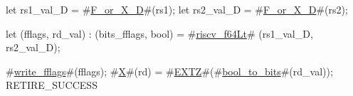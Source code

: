 let rs1_val_D = #\hyperref[sailRISCVzFzyorzyXzyD]{F\_or\_X\_D}#(rs1);
let rs2_val_D = #\hyperref[sailRISCVzFzyorzyXzyD]{F\_or\_X\_D}#(rs2);

let (fflags, rd_val) : (bits_fflags, bool) =
    #\hyperref[sailRISCVzriscvzyf64Lt]{riscv\_f64Lt}# (rs1_val_D, rs2_val_D);

#\hyperref[sailRISCVzwritezyfflags]{write\_fflags}#(fflags);
#\hyperref[sailRISCVzX]{X}#(rd) = #\hyperref[sailRISCVzEXTZ]{EXTZ}#(#\hyperref[sailRISCVzboolzytozybits]{bool\_to\_bits}#(rd_val));
RETIRE_SUCCESS
